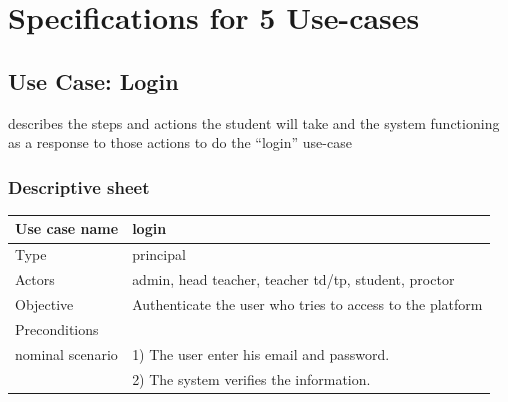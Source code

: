\documentclass[]{uc2pfecaneva}
\begin{document}
    \thispagestyle{empty}
    \begin{table}[h]
        \raggedright\section{Specifications for 5 Use-cases}

        \raggedright\subsection{Use Case: Login}
        describes the steps and actions the student will take and the system functioning as a response
        to those actions to do the “login” use-case
        \subsubsection{Descriptive sheet}
        \centering
        \begin{tabularx}{\textwidth}{|l|X|}
            \hline
            Use case name         & login                                                                                                                                                                \\ \hline
            Type                  & principal                                                                                                                                                            \\ \hline
            Actors                & admin, head teacher, teacher td/tp, student, proctor                                                                                                                 \\ \hline
            Objective             & Authenticate the user who tries to access to the platform                                                                                                            \\ \hline
            Preconditions         &                                                                                                                                                                      \\ \hline
            nominal scenario
            & 1) The user enter his email and password.                                                                                                                            \\
            & 2) The system verifies the information.                                                                                                                              \\

\end{tabularx}
\end{table}
\end{document}
